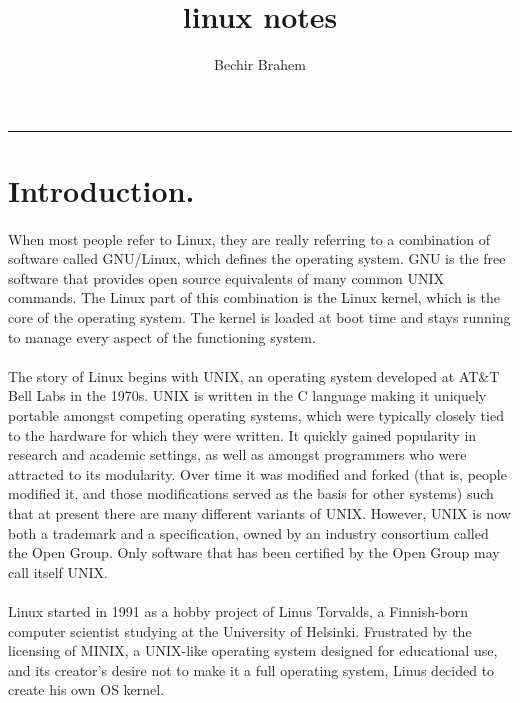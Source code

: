 \documentclass[10pt]{article}
\begin{document}
\title{linux notes}
\author{Bechir Brahem}
\date{\vspace{-5ex}} %
\maketitle
\noindent\rule{\textwidth}{3pt}


\section{Introduction.}
\paragraph{}
When most people refer to Linux, they are really referring to a combination of software called GNU/Linux, which defines the operating
system. GNU is the free software that provides open source equivalents of many common UNIX commands. The Linux part of this combination
is the Linux kernel, which is the core of the operating system. The kernel is loaded at boot time and stays running to manage every
aspect of the functioning system.
\paragraph{}
The story of Linux begins with UNIX, an operating system developed at AT\&T Bell Labs in the 1970s. UNIX is written in the C language
making it uniquely portable amongst competing operating systems, which were typically closely tied to the hardware for which they
were written. It quickly gained popularity in research and academic settings, as well as amongst programmers who were attracted to
its modularity. Over time it was modified and forked (that is, people modified it, and those modifications served as the basis
for other systems) such that at present there are many different variants of UNIX. However, UNIX is now both a trademark and a
specification, owned by an industry consortium called the Open Group. Only software that has been certified by the Open Group may
call itself UNIX.
\paragraph{}
Linux started in 1991 as a hobby project of Linus Torvalds, a Finnish-born computer scientist studying at the University of Helsinki.
Frustrated by the licensing of MINIX, a UNIX-like operating system designed for educational use, and its creator’s desire not
to make it a full operating system, Linus decided to create his own OS kernel.
\end{document}
